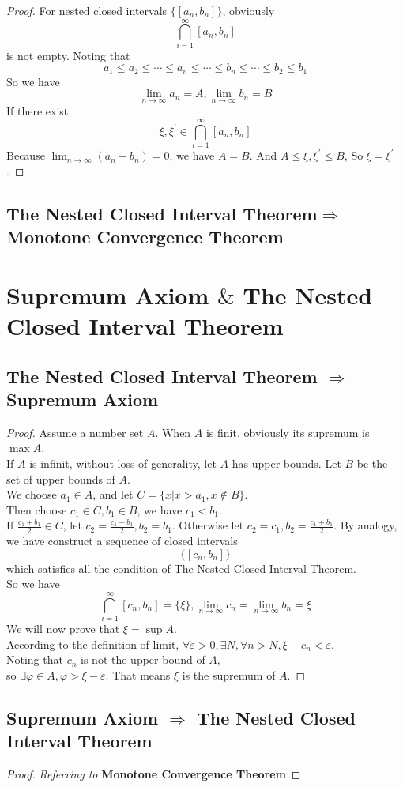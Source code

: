\documentclass{article}
\begin{document}
\begin{proof}
    For nested closed intervals $\{[a_n, b_n ] \}$, obviously 
    $$\bigcap_{i = 1}^{\infty}[a_n, b_n] $$ is not empty.
    Noting that
    $$ a_1 \leqslant  a_2 \leqslant \cdots \leqslant a_n \leqslant \cdots \leqslant b_n \leqslant \cdots \leqslant b_2 \leqslant b_1 $$
    So we have 
    $$ \lim_{n \to \infty}a_n = A, \lim_{n \to \infty}b_n = B $$
    If there exist $$ \xi , \xi^{\prime}\in \bigcap_{i = 1}^{\infty}[a_n, b_n]$$
    Because $\lim_{n \to \infty}(a_n - b_n) = 0$, we have $A = B$. 
    And $A \leqslant \xi, \xi^{\prime} \leqslant B$, 
    So $\xi = \xi^{\prime}$. 
    \qedhere
\end{proof}

\subsection{The Nested Closed Interval Theorem$\Rightarrow$Monotone Convergence Theorem}



\section{Supremum Axiom $\&$  The Nested Closed Interval Theorem}

\subsection{The Nested Closed Interval Theorem $\Rightarrow$ Supremum Axiom}

\begin{proof}
    Assume a number set $A$. When $A$ is finit, obviously its supremum is $\max A$. \\
    If $A$ is infinit, without loss of generality, let $A$ has upper bounds. Let $B$ be the set of upper bounds of $A$. \\
    We choose $a_1 \in A$, and let $C = \{x| x > a_1, x\notin B\}$. \\
    Then choose $c_1 \in C, b_1 \in B$, we have $c_1 < b_1$. \\
    If $\displaystyle{\frac{c_1 + b_ 1}{2} \in C}$, let $c_2 = \displaystyle{\frac{c_1 + b_ 1}{2}}, b_2 = b_1$.
    Otherwise let $c_2 = c_1, b_2 = \displaystyle{\frac{c_1 + b_1}{2}}$.
    By analogy, we have construct a sequence of closed intervals $$\{[c_n, b_n]\}$$ which satisfies all the condition of The Nested Closed Interval Theorem. \\
    So we have $$ \bigcap_{i = 1}^{\infty}[c_n, b_n] = \{\xi\}, \lim_{n \to \infty} c_n =\lim_{n \to \infty} b_n = \xi $$
    We will now prove that $\xi = \sup A$. \\
    According to the definition of limit, $\forall \varepsilon > 0, \exists N, \forall n > N, \xi - c_n < \varepsilon $. \\
    Noting that $c_n$ is not the upper bound of $A$, \\
    so $\exists \varphi \in A, \varphi > \xi - \varepsilon$.
    That means $\xi$ is the supremum of $A$.
\end{proof}

\subsection{Supremum Axiom $\Rightarrow$ The Nested Closed Interval Theorem}

\begin{proof}
    \textit{Referring to} 
    \textbf{Monotone Convergence Theorem}
\end{proof}
\end{document}
